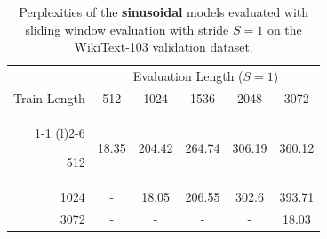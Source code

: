 \begin{table}[t]
\caption{Perplexities of the \textbf{sinusoidal} models evaluated with sliding window evaluation with stride $S=1$ on the WikiText-103 validation dataset.}
\label{tab:sin_extrapolating_cw}
\begin{center}
\begin{tabular}{@{}rccccc@{}}
\toprule
                               &  \multicolumn{5}{c}{Evaluation Length ($S=1$)} \\  
               Train Length               & 512 & 1024 & 1536 & 2048 & 3072 \\\cmidrule(r){1-1} \cmidrule(l){2-6}

512& 18.35& 204.42& 264.74& 306.19& 360.12\\
 1024 &-& 18.05& 206.55& 302.6& 393.71\\
3072 & -&- & -& -& 18.03 \\ \bottomrule
\end{tabular}
\end{center}
\end{table}



